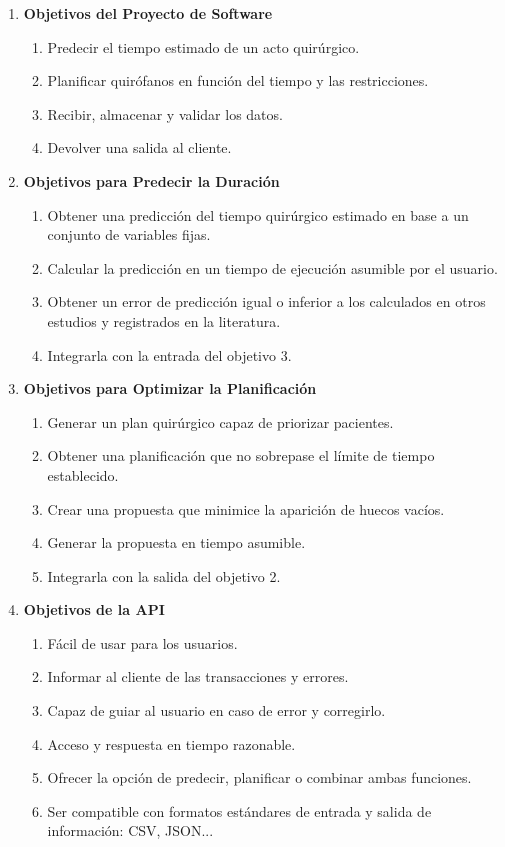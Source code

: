 \begin{enumerate}
    \item \textbf{Objetivos del Proyecto de Software} 
\begin{enumerate}
        \item Predecir el tiempo estimado de un acto quirúrgico.
        \item Planificar quirófanos en función del tiempo y las restricciones.
        \item Recibir, almacenar y validar los datos.
        \item Devolver una salida al cliente.
    \end{enumerate}

    \item \textbf{Objetivos para Predecir la Duración}
\begin{enumerate}
    \item Obtener una predicción del tiempo quirúrgico estimado en base a un conjunto de variables fijas.
    \item Calcular la predicción en un tiempo de ejecución asumible por el usuario.
    \item Obtener un error de predicción igual o inferior a los calculados en otros estudios y registrados en la literatura.
    \item Integrarla con la entrada del objetivo 3.
\end{enumerate}

\item \textbf{Objetivos para Optimizar la Planificación}
        \begin{enumerate}
            \item Generar un plan quirúrgico capaz de priorizar pacientes.
            \item Obtener una planificación que no sobrepase el límite de tiempo establecido.
            \item Crear una propuesta que minimice la aparición de huecos vacíos.
            \item Generar la propuesta en tiempo asumible.
            \item Integrarla con la salida del objetivo 2.
        \end{enumerate}

        \item \textbf{Objetivos de la API}
        \begin{enumerate}
            \item Fácil de usar para los usuarios.
            \item Informar al cliente de las transacciones y errores.
            \item Capaz de guiar al usuario en caso de error y corregirlo.
            \item Acceso y respuesta en tiempo razonable.
            \item Ofrecer la opción de predecir, planificar o combinar ambas funciones.
            \item Ser compatible con formatos estándares de entrada y salida de información: CSV, JSON...
            \end{enumerate}
            \end{enumerate}
\newpage

